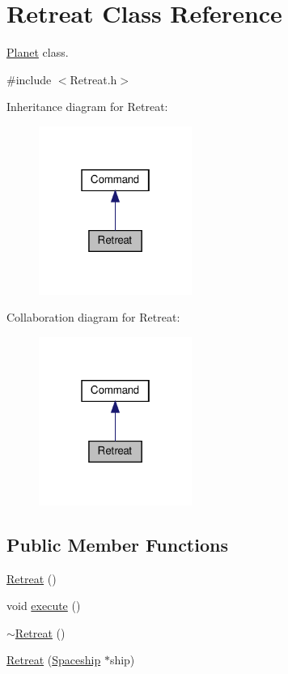 \hypertarget{classRetreat}{}\section{Retreat Class Reference}
\label{classRetreat}


\hyperlink{classPlanet}{Planet} class.  




{\ttfamily \#include $<$Retreat.\+h$>$}



Inheritance diagram for Retreat\+:\nopagebreak
\begin{figure}[H]
\begin{center}
\leavevmode
\includegraphics[width=142pt]{classRetreat__inherit__graph}
\end{center}
\end{figure}


Collaboration diagram for Retreat\+:\nopagebreak
\begin{figure}[H]
\begin{center}
\leavevmode
\includegraphics[width=142pt]{classRetreat__coll__graph}
\end{center}
\end{figure}
\subsection*{Public Member Functions}
\begin{DoxyCompactItemize}
\item 
\hyperlink{classRetreat_a889d73ed4b9fcdf13cfa986145d8763a}{Retreat} ()
\item 
void \hyperlink{classRetreat_a18fe7bf00ed623de02de5764b9607f5f}{execute} ()
\item 
\hyperlink{classRetreat_af14f96d3b46f7757511442c01f20edd9}{$\sim$\+Retreat} ()
\item 
\hyperlink{classRetreat_ab748f69c4ed3552908789bc18c73f917}{Retreat} (\hyperlink{classSpaceship}{Spaceship} $\ast$ship)
\end{DoxyCompactItemize}


